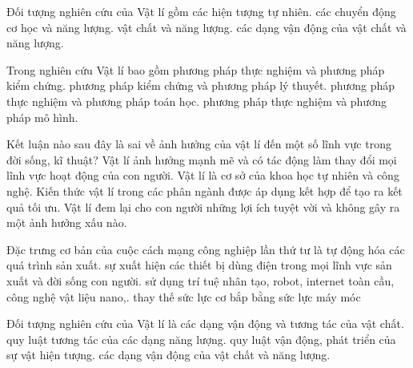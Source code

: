 \begin{ex}
Đối tượng nghiên cứu của Vật lí gồm
\choice
{các hiện tượng tự nhiên.}
{các chuyển động cơ học và năng lượng.}
{vật chất và năng lượng.}
{\True các dạng vận động của vật chất và năng lượng.}
\end{ex}

\begin{ex}
Trong nghiên cứu Vật lí bao gồm
\choice
{phương pháp thực nghiệm và phương pháp kiểm chứng.}
{phương pháp kiểm chứng và phương pháp lý thuyết.}
{phương pháp thực nghiệm và phương pháp toán học.}
{\True phương pháp thực nghiệm và phương pháp mô hình.}
\end{ex}

\begin{ex}
Kết luận nào sau đây là sai về ảnh hưởng của vật lí đến một số lĩnh vực trong đời sống, kĩ thuật?
\choice
{Vật lí ảnh hưởng mạnh mẽ và có tác động làm thay đổi mọi lĩnh vực hoạt động của con người.}
{Vật lí là cơ sở của khoa học tự nhiên và công nghệ.}
{Kiến thức vật lí trong các phân ngành được áp dụng kết hợp để tạo ra kết quả tối ưu.}
{\True Vật lí đem lại cho con người những lợi ích tuyệt vời và không gây ra một ảnh hưởng xấu nào.}
\end{ex}

\begin{ex}
Đặc trưng cơ bản của cuộc cách mạng công nghiệp lần thứ tư là
\choice
{tự động hóa các quá trình sản xuất.}
{sự xuất hiện các thiết bị dùng điện trong mọi lĩnh vực sản xuất và đời sống con người.}
{\True sử dụng trí tuệ nhân tạo, robot, internet toàn cầu, công nghệ vật liệu nano,.}
{thay thế sức lực cơ bắp bằng sức lực máy móc}
\end{ex}

\begin{ex}
Đối tượng nghiên cứu của Vật lí là 
\choice
{các dạng vận động và tương tác của vật chất.}
{quy luật tương tác của các dạng năng lượng.}
{quy luật vận động, phát triển của sự vật hiện tượng.}
{\True các dạng vận động của vật chất và năng lượng.}
\end{ex}

